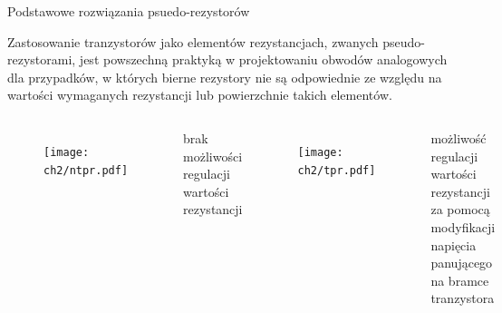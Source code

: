 



\begin{frame}{Podstawowe rozwiązania psuedo-rezystorów}
    \vspace{-1em}
    \begin{block}{}
        Zastosowanie tranzystorów jako elementów rezystancjach, zwanych pseudo-rezystorami, jest powszechną praktyką w projektowaniu obwodów analogowych dla przypadków, w których bierne rezystory nie są odpowiednie ze względu na wartości wymaganych rezystancji lub powierzchnie takich elementów. 
       \end{block}
    \begin{columns}
        \vspace{-2em}
        \begin{figure}[H]
            \texttt{[image: ch2/ntpr.pdf]}
        \end{figure}
        \begin{alertblock}{}
            brak możliwości regulacji wartości rezystancji
        \end{alertblock}



        \vspace{-1em}

        \begin{figure}[H]
            \texttt{[image: ch2/tpr.pdf]}
        \end{figure}
        \vspace{-1em}
        \begin{exampleblock}{}
            możliwość regulacji wartości rezystancji za pomocą modyfikacji napięcia panującego na bramce tranzystora
        \end{exampleblock}

    \end{columns}
\end{frame}









        


